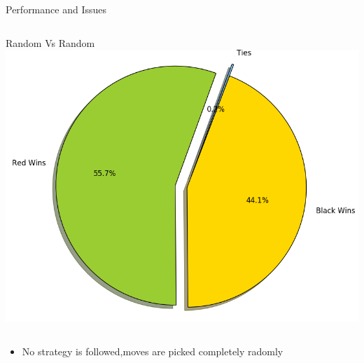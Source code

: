 \documentclass{beamer}
\begin{document}
\begin{frame}{Performance and Issues}
  \begin{columns}
	 	\begin{column}{0.3\textwidth}
			Random Vs Random
			\includegraphics[scale = 0.35]{randVsrand.png}
	 	\end{column}
	\end{columns} 	

		
	\begin{itemize}
 		\item No strategy is followed,moves are picked completely radomly 
	\end{itemize}

\end{frame}
\end{document}
